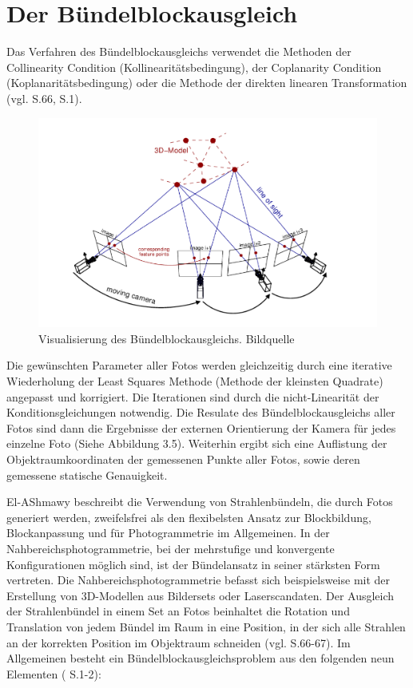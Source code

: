 \section{Der Bündelblockausgleich}

Das Verfahren des Bündelblockausgleichs verwendet die Methoden der \glqq Collinearity Condition \grqq{} (Kollinearitätsbedingung), der \glqq Coplanarity Condition\grqq{} (Koplanaritätsbedingung) oder die Methode der direkten linearen Transformation (vgl. \cite{comparative_conditions_study} S.66, \cite{coll_exterior} S.1).

\begin{figure}[H]
	\centering
	\includegraphics[scale=0.55]{bundle.png}
	\caption{Visualisierung des Bündelblockausgleichs. Bildquelle \cite{efficient_bundle}}
\end{figure}

Die gewünschten Parameter aller Fotos werden gleichzeitig durch eine iterative Wiederholung der \glqq Least Squares\grqq{} Methode (Methode der kleinsten Quadrate) angepasst und korrigiert. 
Die Iterationen sind durch die nicht-Linearität der Konditionsgleichungen notwendig. Die Resulate des Bündelblockausgleichs aller Fotos sind dann die Ergebnisse der externen Orientierung der Kamera für jedes einzelne Foto (Siehe Abbildung 3.5). Weiterhin ergibt sich eine Auflistung der Objektraumkoordinaten der gemessenen Punkte aller Fotos, sowie deren gemessene statische Genauigkeit. 

El-AShmawy \cite{comparative_conditions_study} beschreibt die Verwendung von Strahlenbündeln, die durch Fotos generiert werden, zweifelsfrei als den flexibelsten Ansatz zur Blockbildung, Blockanpassung und für Photogrammetrie im Allgemeinen. In der Nahbereichsphotogrammetrie, bei der mehrstufige und konvergente Konfigurationen möglich sind, ist der Bündelansatz in seiner stärksten Form vertreten. Die Nahbereichsphotogrammetrie befasst sich beispielsweise mit der Erstellung von 3D-Modellen aus Bildersets oder Laserscandaten. Der Ausgleich der Strahlenbündel in einem Set an Fotos beinhaltet die Rotation und Translation von jedem Bündel im Raum in eine Position, in der sich alle Strahlen an der korrekten Position im Objektraum schneiden (vgl. \cite{comparative_conditions_study} S.66-67). Im Allgemeinen besteht ein Bündelblockausgleichsproblem aus den folgenden neun Elementen (\cite{bundle_adjustment} S.1-2):


